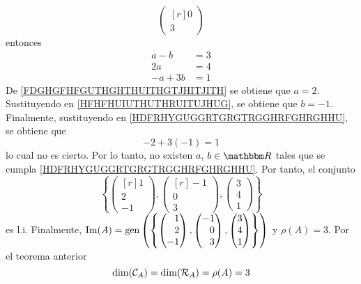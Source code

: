 \begin{example}
$$\begin{pmatrix*}[r]
        0 \\
        3
    \end{pmatrix*}$$
    entonces
    \begin{align}
        a - b & = 3 \label{HFHFHUIUTHUTHRUITUJHUG} \\
        2a & = 4 \label{FDGHGFHFGUTHGHTHUITHGTJHITJITH} \\
        -a + 3b & = 1 \label{HDFRHYGUGGRTGRGTRGGHRFGHRGHHU}
    \end{align}
    De \eqref{FDGHGFHFGUTHGHTHUITHGTJHITJITH} se obtiene que $a = 2$. Sustituyendo en \eqref{HFHFHUIUTHUTHRUITUJHUG}, se obtiene que $b=-1$. Finalmente, sustituyendo en \eqref{HDFRHYGUGGRTGRGTRGGHRFGHRGHHU}, se obtiene que
    $$-2 + 3(-1) = 1$$
    lo cual no es cierto. Por lo tanto, no existen $a$, $b \in \RR$ tales que se cumpla \eqref{HDFRHYGUGGRTGRGTRGGHRFGHRGHHU}. Por tanto, el conjunto
    $$\left\{ \begin{pmatrix*}[r]
        1 \\
        2 \\
        -1
    \end{pmatrix*},  \begin{pmatrix*}[r]
        -1 \\
        0 \\
        3
    \end{pmatrix*},  \begin{pmatrix}
        3 \\
        4 \\
        1
    \end{pmatrix} \right\}$$
    es l.i. Finalmente, $\Ima(A) = \Gen \left(\left\{ \begin{pmatrix*}[r]
        1 \\
        2 \\
        -1
    \end{pmatrix*},  \begin{pmatrix*}[r]
        -1 \\
        0 \\
        3
    \end{pmatrix*},  \begin{pmatrix}
        3 \\
        4 \\
        1
    \end{pmatrix} \right\}\right)$ y $\rho(A) = 3$. Por el teorema anterior
    $$\operatorname{dim}(\mathcal{C}_A) = \operatorname{dim}(\mathcal{R}_A) = \rho(A) = 3$$
\end{example}

